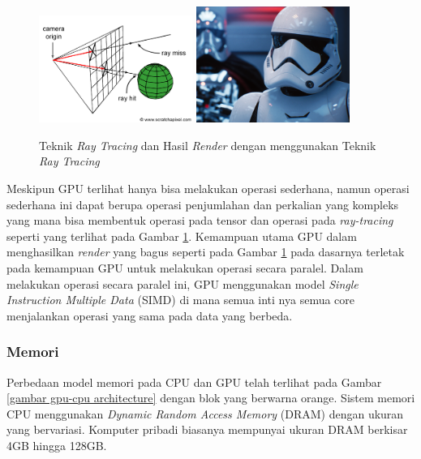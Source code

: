 \begin{figure}[H]
  \centering
  \includegraphics[width=5cm]{images/rt-setup2.png}
  \includegraphics[width=5cm]{images/Reflections_02.png}
  \caption{Teknik \emph{Ray Tracing} dan Hasil \emph{Render} dengan menggunakan
  Teknik \emph{Ray Tracing}}
  \label{gambar ray tracing technique}
\end{figure}

Meskipun GPU terlihat hanya bisa melakukan operasi sederhana, namun operasi sederhana
ini dapat berupa operasi penjumlahan dan perkalian yang kompleks yang mana bisa membentuk
operasi pada tensor dan operasi pada \emph{ray-tracing} seperti yang terlihat
pada Gambar \ref{gambar ray tracing technique}. Kemampuan utama GPU dalam menghasilkan
\emph{render} yang bagus seperti pada Gambar \ref{gambar ray tracing technique}
pada dasarnya terletak pada kemampuan GPU untuk melakukan operasi secara paralel.
Dalam melakukan operasi secara paralel ini, GPU menggunakan model \emph{Single
Instruction Multiple Data} (SIMD) di mana semua inti nya semua core menjalankan operasi
yang sama pada data yang berbeda.

\subsubsection{Memori}

Perbedaan model memori pada CPU dan GPU telah terlihat pada Gambar
\ref{gambar gpu-cpu architecture} dengan blok yang berwarna orange. Sistem memori
CPU menggunakan \emph{Dynamic Random Access Memory} (DRAM) dengan ukuran yang
bervariasi. Komputer pribadi biasanya mempunyai ukuran DRAM berkisar 4GB hingga 128GB.

